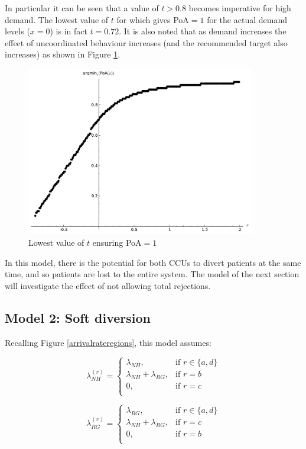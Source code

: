 \documentclass{article}
\begin{document}
In particular it can be seen that a value of $t>0.8$ becomes imperative for high demand.
The lowest value of $t$ for which gives PoA$=1$ for the actual demand levels ($x=0$) is in fact $t=0.72$.
It is also noted that as demand increases the effect of uncoordinated behaviour increases (and the recommended target also increases) as shown in Figure \ref{mintargetvdemand}.

\begin{figure}[!htbp]
\begin{center}
\includegraphics[width=10cm]{./Images/argminPoAmodel1.pdf}
\caption{Lowest value of $t$ ensuring PoA$=1$} \label{mintargetvdemand}
\end{center}
\end{figure}

In this model, there is the potential for both CCUs to divert patients at the same time, and so patients are lost to the entire system. The model of the next section will investigate the effect of not allowing total rejections.

\subsection{Model 2: Soft diversion}

Recalling Figure \ref{arrivalrateregions}, this model assumes:

\begin{minipage}[t]{0.5\textwidth}
\small{$$\lambda_{NH}^{(r)}=\begin{cases}
\lambda_{NH}, &\text{if }r\in\{a,d\}\\
\lambda_{NH}+\lambda_{RG},  &\text{if }r=b\\
0, &\text{if }r=c\\
\end{cases}$$}
\end{minipage}
\begin{minipage}[t]{0.5\textwidth}
\small{$$\lambda_{RG}^{(r)}=\begin{cases}
\lambda_{RG}, &\text{if }r\in\{a,d\}\\
\lambda_{NH}+\lambda_{RG},  &\text{if }r=c\\
0, &\text{if }r=b\\
\end{cases}$$}
\end{minipage}
\end{document}
